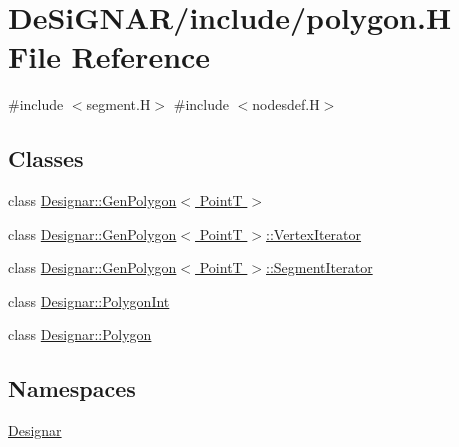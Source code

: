 \hypertarget{polygon_8_h}{}\section{De\+Si\+G\+N\+A\+R/include/polygon.H File Reference}
\label{polygon_8_h}
{\ttfamily \#include $<$segment.\+H$>$}\newline
{\ttfamily \#include $<$nodesdef.\+H$>$}\newline
\subsection*{Classes}
\begin{DoxyCompactItemize}
\item 
class \hyperlink{class_designar_1_1_gen_polygon}{Designar\+::\+Gen\+Polygon$<$ Point\+T $>$}
\item 
class \hyperlink{class_designar_1_1_gen_polygon_1_1_vertex_iterator}{Designar\+::\+Gen\+Polygon$<$ Point\+T $>$\+::\+Vertex\+Iterator}
\item 
class \hyperlink{class_designar_1_1_gen_polygon_1_1_segment_iterator}{Designar\+::\+Gen\+Polygon$<$ Point\+T $>$\+::\+Segment\+Iterator}
\item 
class \hyperlink{class_designar_1_1_polygon_int}{Designar\+::\+Polygon\+Int}
\item 
class \hyperlink{class_designar_1_1_polygon}{Designar\+::\+Polygon}
\end{DoxyCompactItemize}
\subsection*{Namespaces}
\begin{DoxyCompactItemize}
\item 
 \hyperlink{namespace_designar}{Designar}
\end{DoxyCompactItemize}
